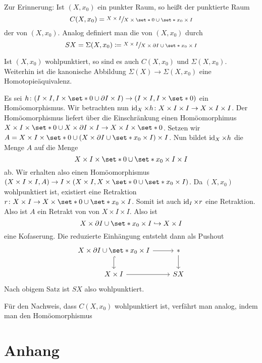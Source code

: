 Zur Erinnerung: Ist $(X,x_0)$ ein punkter Raum, so heißt der punktierte Raum 
\[
	C(X,x_0) = \sfrac{X \times I}{X \times \set*{0} \cup \set*{x_0} \times I}
\]
der  von $(X,x_0)$.
Analog definiert man die  von $(X,x_0)$ durch
\[
	S X =\Sigma(X,x_0) \coloneqq \sfrac{X \times I}{X \times \partial I \cup \set*{x_0} \times I}
\]

\begin{satz}
	Ist $(X,x_0)$ wohlpunktiert, so sind es auch $C(X,x_0)$ und $\Sigma(X,x_0)$.
	Weiterhin ist die kanonische Abbildung $\Sigma(X) \to \Sigma(X,x_0)$ eine Homotopieäquivalenz.
\end{satz}
\begin{beweis}
	Es sei $h \colon (I \times I,I \times \set*{0} \cup \partial I \times I) \to (I \times I, I \times \set*{0})$ ein Homöomorphismus.
	Wir betrachten nun $\operatorname{id}_X \times h \colon X \times I \times I \to X \times I \times I$.
	Der Homöomorphismus liefert über die Einschränkung einen Homöomorphimus $X \times I \times \set*{0} \cup X \times \partial I \times I \to X \times I \times \set*{0}$.
	Setzen wir $A=X \times I \times \set*{0} \cup \enbrace*{X \times \partial I\cup \set*{x_0} \times I} \times I$.
	Nun bildet $\operatorname{id}_X \times h$ die Menge $A$ auf die Menge
	\[
		X \times I \times \set*{0} \cup \set*{x_0} \times I \times I
	\]
	ab.
	Wir erhalten also einen Homöomorphismus $(X \times I \times I,A) \to I \times \enbrace*{X \times I,X \times \set*{0} \cup \set*{x_0} \times I}$.
	Da $(X,x_0)$ wohlpunktiert ist, existiert eine Retraktion $r \colon X \times I \to X \times \set*{0} \cup \set*{x_0} \times I$.
	Somit ist auch $\operatorname{id}_I \times r$ eine Retraktion.
	Also ist $A$ ein Retrakt von von $X \times I \times I$.
	Also ist 
	\[
		X \times \partial I \cup \set*{x_0} \times I \hookrightarrow X \times I
	\]
	eine Kofaserung.
	Die reduzierte Einhängung entsteht dann als Pushout
	\[
		\begin{tikzcd}
			X \times \partial I \cup \set*{x_0} \times I \rar \dar[hook] & * \dar\\
			X \times I \rar & SX
		\end{tikzcd}
	\]
	Nach obigem Satz ist $SX$ also wohlpunktiert.
	
	Für den Nachweis, dass $C(X,x_0)$ wohlpunktiert ist, verfährt man analog, indem man den Homöomorphismus 
\end{beweis}

\cleardoubleoddemptypage
{}
\setcounter{page}{1}
\cleardoubleoddemptypage
\appendix

\section{Anhang} %
\label{sec:anhang}

\printindex
\printbibliography
\listoffigures
\todototoc
{}


